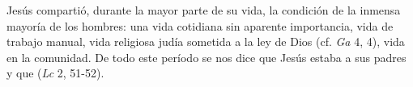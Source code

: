 	
	 Jesús compartió, durante la mayor parte de su vida, la condición de la inmensa mayoría de los hombres: una vida cotidiana sin aparente importancia, vida de trabajo manual, vida religiosa judía sometida a la ley de Dios (cf. \emph{Ga} 4, 4), vida en la comunidad. De todo este período se nos dice que Jesús estaba  a sus padres y que  (\emph{Lc} 2, 51-52).